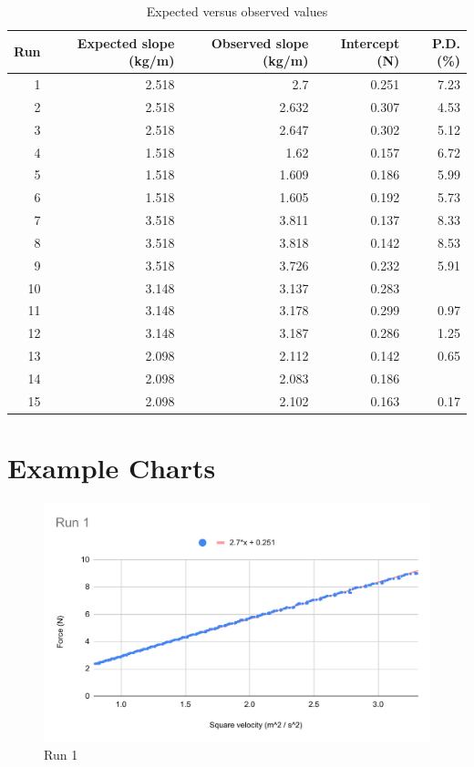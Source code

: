 \begin{table}[ht!]
    \begin{center}
        \begin{tabular}{r | r | r | r | r}
            \textbf{Run} & \textbf{Expected slope} (kg/m) & \textbf{Observed slope} (kg/m) & \textbf{Intercept} (N) & \textbf{P.D.} (\%) \\
            \hline
            1 & 2.518 & 2.7 & 0.251 & 7.23 \\
            2 & 2.518 & 2.632 & 0.307 & 4.53 \\
            3 & 2.518 & 2.647 & 0.302 & 5.12 \\
            \hline
            4 & 1.518 & 1.62 & 0.157 & 6.72 \\
            5 & 1.518 & 1.609 & 0.186 & 5.99 \\
            6 & 1.518 & 1.605 & 0.192 & 5.73 \\
            \hline
            7 & 3.518 & 3.811 & 0.137 & 8.33 \\
            8 & 3.518 & 3.818 & 0.142 & 8.53 \\
            9 & 3.518 & 3.726 & 0.232 & 5.91 \\
            \hline
            10 & 3.148 & 3.137 & 0.283 & \textminus 0.33 \\
            11 & 3.148 & 3.178 & 0.299 & 0.97 \\
            12 & 3.148 & 3.187 & 0.286 & 1.25 \\
            \hline
            13 & 2.098 & 2.112 & 0.142 & 0.65 \\
            14 & 2.098 & 2.083 & 0.186 & \textminus 0.73 \\
            15 & 2.098 & 2.102 & 0.163 & 0.17 \\
            \hline
        \end{tabular}
    \end{center}
    \caption{Expected versus observed values}
    \label{table:06.centripetal.results}
\end{table}
%
\newpage
\section{Example Charts}
%
\begin{figure}[ht]
    \begin{center}
        \includegraphics[scale=0.71]{image/10-centripetal/lab-6-Run-1.pdf}
    \end{center}
    \caption{Run 1}
    \label{fig:06.centripetal.run.1}
\end{figure}